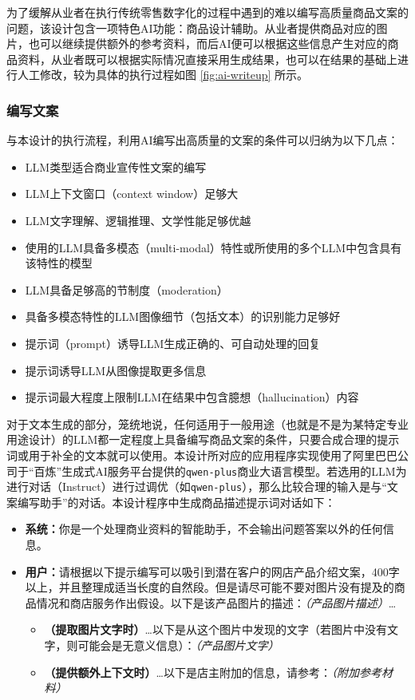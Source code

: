 为了缓解从业者在执行传统零售数字化的过程中遇到的难以编写高质量商品文案的问题，该设计包含一项特色AI功能：商品设计辅助。从业者提供商品对应的图片，也可以继续提供额外的参考资料，而后AI便可以根据这些信息产生对应的商品资料，从业者既可以根据实际情况直接采用生成结果，也可以在结果的基础上进行人工修改，较为具体的执行过程如图 \ref{fig:ai-writeup} 所示。

\subsubsection{编写文案}

与本设计的执行流程，利用AI编写出高质量的文案的条件可以归纳为以下几点：

\begin{itemize}
    \item LLM类型适合商业宣传性文案的编写
    \item LLM上下文窗口（context window）足够大
    \item LLM文字理解、逻辑推理、文学性能足够优越
    \item 使用的LLM具备多模态（multi-modal）特性或所使用的多个LLM中包含具有该特性的模型
    \item LLM具备足够高的节制度（moderation）
    \item 具备多模态特性的LLM图像细节（包括文本）的识别能力足够好
    \item 提示词（prompt）诱导LLM生成正确的、可自动处理的回复
    \item 提示词诱导LLM从图像提取更多信息
    \item 提示词最大程度上限制LLM在结果中包含臆想（hallucination）内容
\end{itemize}

对于文本生成的部分，笼统地说，任何适用于一般用途（也就是不是为某特定专业用途设计）的LLM都一定程度上具备编写商品文案的条件，只要合成合理的提示词或用于补全的文本就可以使用。本设计所对应的应用程序实现使用了阿里巴巴公司于“百炼”生成式AI服务平台提供的\verb|qwen-plus|商业大语言模型。若选用的LLM为进行对话（Instruct）进行过调优（如\verb|qwen-plus|），那么比较合理的输入是与“文案编写助手”的对话。本设计程序中生成商品描述提示词对话如下：

\begin{itemize}
    \item[] \textbf{系统：}你是一个处理商业资料的智能助手，不会输出问题答案以外的任何信息。
    \item[] \textbf{用户：}请根据以下提示编写可以吸引到潜在客户的网店产品介绍文案，400字以上，并且整理成适当长度的自然段。但是请尽可能不要对图片没有提及的商品情况和商店服务作出假设。以下是该产品图片的描述：\textit{（产品图片描述）}\dots
    \begin{itemize}
        \item[] \textbf{（提取图片文字时）}\dots 以下是从这个图片中发现的文字（若图片中没有文字，则可能会是无意义信息）：\textit{（产品图片文字）}
        \item[] \textbf{（提供额外上下文时）}\dots 以下是店主附加的信息，请参考：\textit{（附加参考材料）}
    \end{itemize}
\end{itemize}

